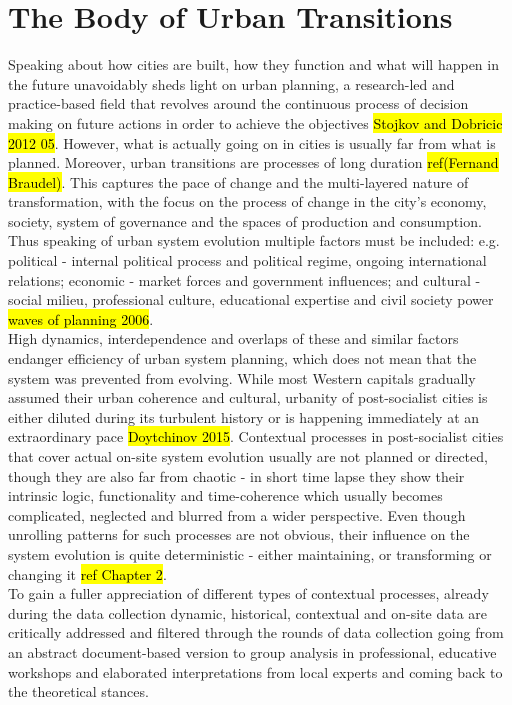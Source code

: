 \documentclass[11pt]{report}
\begin{document}
\section{The Body of Urban Transitions}

Speaking about how cities are built, how they function and what will happen in the future unavoidably sheds light on urban planning, a research-led and practice-based field that revolves around the continuous process of decision making on future actions in order to achieve the objectives \hl{Stojkov and Dobricic 2012 05}.
However, what is actually going on in cities is usually far from what is planned.
Moreover, urban transitions are processes of long duration \hl{ref(Fernand Braudel)}.
This captures the pace of change and the multi-layered nature of transformation, with the focus on the process of change in the city’s economy, society, system of governance and the spaces of production and consumption.
Thus speaking of urban system evolution multiple factors must be included: e.g. political - internal political process and political regime, ongoing international relations; economic - market forces and government influences;  and cultural - social milieu, professional  culture, educational  expertise and civil society power \hl{waves of planning 2006}.
\\
High dynamics, interdependence and overlaps of these and similar factors endanger efficiency of urban system planning, which does not mean that the system was prevented from evolving.
While most Western capitals gradually assumed their urban coherence and cultural, urbanity of post-socialist cities is either diluted during its turbulent history or is happening immediately at an extraordinary pace \hl{Doytchinov 2015}.
Contextual processes in post-socialist cities that cover actual on-site system evolution usually are not planned or directed, though they are also far from chaotic - in short time lapse they show their intrinsic logic, functionality and time-coherence which usually becomes complicated, neglected and blurred from a wider perspective.
Even though unrolling patterns for such processes are not obvious, their influence on the system evolution is quite deterministic - either maintaining, or transforming or changing it \hl{ref Chapter 2}. 
\\
To gain a fuller appreciation of different types of contextual processes, already during the data collection dynamic, historical, contextual and on-site data are critically addressed and filtered through the rounds of data collection going from an abstract document-based version to group analysis in professional, educative workshops and elaborated interpretations from local experts and coming back to the theoretical stances.
\end{document}
